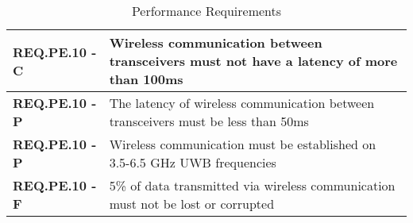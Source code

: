 \begin{table}[H]
\begin{tabular}{ | m{3.5cm} | m{12.5cm} | }
\hline
 \textbf{ REQ.PE.10 - C } & Wireless communication between transceivers must not have a latency of more than 100ms \\
\hline
 \textbf{ REQ.PE.10 - P } & The latency of wireless communication between transceivers must be less than 50ms \\
\hline
 \textbf{ REQ.PE.10 - P } & Wireless communication must be established on 3.5-6.5 GHz UWB frequencies \\
\hline
 \textbf{ REQ.PE.10 - F } & 5\% of data transmitted via wireless communication must not be lost or corrupted \\
\hline

\end{tabular}
\caption{Performance Requirements}
\end{table}

%

